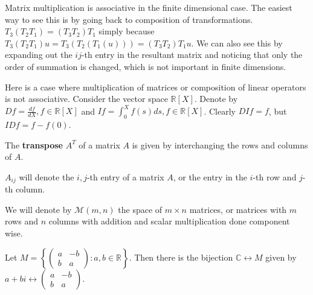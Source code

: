 \begin{rem}
Matrix multiplication is associative in the finite dimensional case. The
easiest way to see this is by going back to composition of
transformations. $T_3 (T_2 T_1) = (T_3 T_2) T_1$ simply because $T_3
(T_2 T_1) u = T_3(T_2(T_1(u))) = (T_3 T_2) T_1 u$. We can also see this
by expanding out the $ij$-th entry in the resultant matrix and noticing
that only the order of summation is changed, which is not important in
finite dimensions.
\end{rem}

\begin{ex}
Here is a case where multiplication of matrices or composition of linear
operators is not associative. Consider the vector space $\mathbb{R}[X]$.
Denote by $Df = \frac{df}{dX}, f \in \mathbb{R}[X]$ and $If = \int_0^X
f(s) ds, f \in \mathbb{R}[X]$. Clearly $DIf = f$, but $IDf = f - f(0)$.
\end{ex}

\begin{df}
The \textbf{transpose} $A^T$ of a matrix $A$ is given by interchanging
the rows and columns of $A$.
\end{df}

\begin{rem}
$A_{ij}$ will denote the $i,j$-th entry of a matrix $A$, or the entry in
the $i$-th row and $j$-th column.
\end{rem}

\begin{df}
We will denote by $\mathcal{M}(m, n)$ the space of $m \times n$
matrices, or matrices with $m$ rows and $n$ columns with addition and
scalar multiplication done component wise.
\end{df}

\begin{rem}
Let $M = \left\lbrace \begin{pmatrix} a & -b \\ b & a \end{pmatrix} : a, b
\in \mathbb{R}\right\rbrace$. Then there is the bijection $\mathbb{C}
\leftrightarrow M$ given by $a + bi \leftrightarrow \begin{pmatrix} a &
-b \\ b & a \end{pmatrix}$.
\end{rem}
